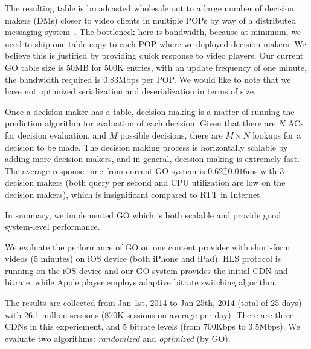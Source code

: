  The resulting table is broadcasted wholesale out to a large number of decision makers (DMs) closer to video clients in multiple POPs by way of a distributed messaging system~\cite{kafka}. The bottleneck here is bandwidth, because at minimum, we need to ship one table copy to each POP where we deployed decision makers. We believe this is justified by providing quick response to video players. Our current GO table size is 50MB for 500K entries, with an update frequency of one minute, the bandwidth required is 0.83Mbps per POP. We would like to note that we have not optimized serialization and deserialization in terms of size.

 Once a decision maker has a table, decision making is a matter of running the prediction algorithm for evaluation of each decision. Given that there are $N$ ACs for decision evaluation, and $M$ possible decisions, there are $M \times N$ lookups for a decision to be made. The decision making process is horizontally scalable by adding more decision makers, and in general, decision making is extremely fast. The average response time from current GO system is $0.62 ^{+}_{-} 0.016$ms with 3 decision makers (both query per second and CPU utilization are low on the decision makers), which is insignificant compared to RTT in Internet.

In summary, we implemented GO which is both scalable and provide good system-level performance.


\label{subsec:eval_setup}

We evaluate the performance of GO on one content provider with short-form videos (5 minutes) on iOS device (both iPhone and iPad). 
HLS protocol is running on the iOS device and our GO system provides the initial CDN and bitrate, while Apple player employs adaptive 
bitrate switching algorithm. 

The results are collected from Jan 1st, 2014 to Jan 25th, 2014 (total of 25 days) with 26.1 million sessions (870K sessions on average per day).
There are three CDNs in this experiement, and 5 bitrate levels (from 700Kbps to 3.5Mbps). We evaluate two algorithms: {\it randomized} 
and {\it optimized} (by GO).

\label{subsec:real-world-improvement}

